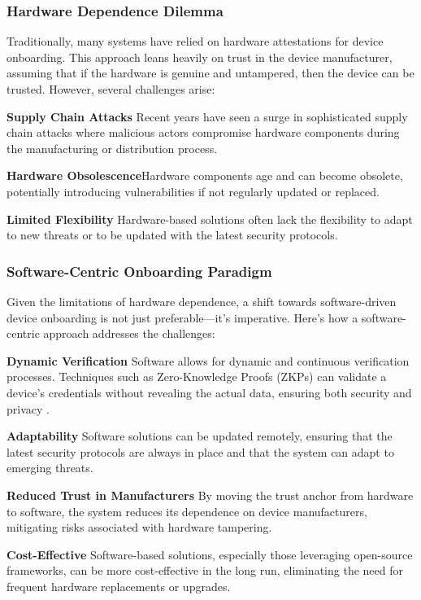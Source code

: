 \documentclass{article}
\begin{document}
\subsubsection{Hardware Dependence Dilemma}
Traditionally, many systems have relied on hardware attestations for device onboarding. This approach leans heavily on trust in the device manufacturer, assuming that if the hardware is genuine and untampered, then the device can be trusted. However, several challenges arise:

\textbf{Supply Chain Attacks} Recent years have seen a surge in sophisticated supply chain attacks where malicious actors compromise hardware components during the manufacturing or distribution process\cite{perlroth2020supply}.

\textbf{Hardware Obsolescence}Hardware components age and can become obsolete, potentially introducing vulnerabilities if not regularly updated or replaced.

\textbf{Limited Flexibility} Hardware-based solutions often lack the flexibility to adapt to new threats or to be updated with the latest security protocols.

\subsubsection{Software-Centric Onboarding Paradigm}
Given the limitations of hardware dependence, a shift towards software-driven device onboarding is not just preferable—it's imperative. Here's how a software-centric approach addresses the challenges:

\textbf{Dynamic Verification} Software allows for dynamic and continuous verification processes. Techniques such as Zero-Knowledge Proofs (ZKPs) can validate a device's credentials without revealing the actual data, ensuring both security and privacy \cite{bensasson2014succinct}.

\textbf{Adaptability} Software solutions can be updated remotely, ensuring that the latest security protocols are always in place and that the system can adapt to emerging threats.

\textbf{Reduced Trust in Manufacturers} By moving the trust anchor from hardware to software, the system reduces its dependence on device manufacturers, mitigating risks associated with hardware tampering.

\textbf{Cost-Effective} Software-based solutions, especially those leveraging open-source frameworks, can be more cost-effective in the long run, eliminating the need for frequent hardware replacements or upgrades.
\end{document}
